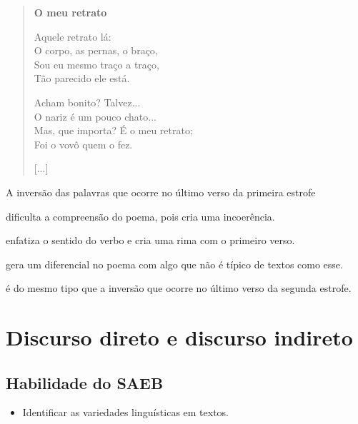 \begin{myquote}
\begin{verse}
\textbf{O meu retrato}

Aquele retrato lá:\\
O corpo, as pernas, o braço,\\
Sou eu mesmo traço a traço,\\
Tão parecido ele está.

Acham bonito? Talvez...\\
O nariz é um pouco chato...\\
Mas, que importa? É o meu retrato;\\
Foi o vovô quem o fez.

{[}...{]}
\end{verse}

\end{myquote}

A inversão das palavras que ocorre no último verso da primeira estrofe

\begin{escolha}[itemsep=-5pt]
\item dificulta a compreensão do poema, pois cria uma incoerência.

\item enfatiza o sentido do verbo e cria uma rima com o primeiro verso.

\item gera um diferencial no poema com algo que não é típico de textos como esse.

\item é do mesmo tipo que a inversão que ocorre no último verso da segunda estrofe.
\end{escolha}

\chapter{Discurso direto e discurso indireto}

\section*{Habilidade do SAEB}

\begin{itemize}
  \item Identificar as variedades linguísticas em textos.
\end{itemize}

